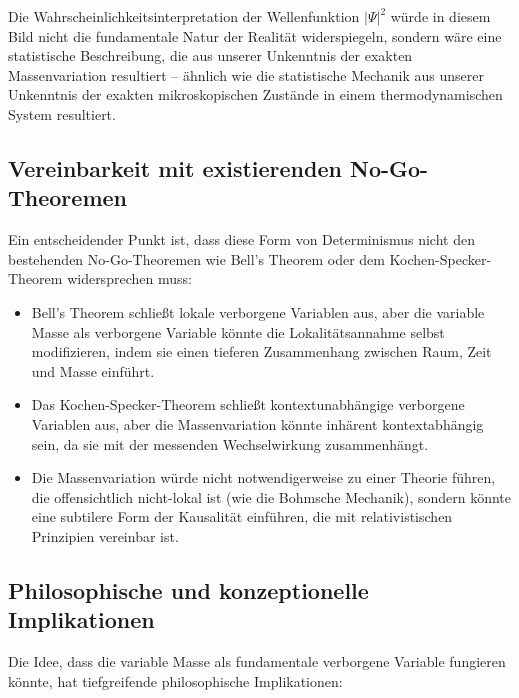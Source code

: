 \documentclass[12pt,a4paper]{article}  %
\begin{document}
	Die Wahrscheinlichkeitsinterpretation der Wellenfunktion $|\Psi|^2$ würde in diesem Bild nicht die fundamentale Natur der Realität widerspiegeln, sondern wäre eine statistische Beschreibung, die aus unserer Unkenntnis der exakten Massenvariation resultiert – ähnlich wie die statistische Mechanik aus unserer Unkenntnis der exakten mikroskopischen Zustände in einem thermodynamischen System resultiert.
	
	\subsection{Vereinbarkeit mit existierenden No-Go-Theoremen}
	
	Ein entscheidender Punkt ist, dass diese Form von Determinismus nicht den bestehenden No-Go-Theoremen wie Bell's Theorem oder dem Kochen-Specker-Theorem widersprechen muss:
	
	\begin{itemize}
		\item Bell's Theorem schließt lokale verborgene Variablen aus, aber die variable Masse als verborgene Variable könnte die Lokalitätsannahme selbst modifizieren, indem sie einen tieferen Zusammenhang zwischen Raum, Zeit und Masse einführt.
		
		\item Das Kochen-Specker-Theorem schließt kontextunabhängige verborgene Variablen aus, aber die Massenvariation könnte inhärent kontextabhängig sein, da sie mit der messenden Wechselwirkung zusammenhängt.
		
		\item Die Massenvariation würde nicht notwendigerweise zu einer Theorie führen, die offensichtlich nicht-lokal ist (wie die Bohmsche Mechanik), sondern könnte eine subtilere Form der Kausalität einführen, die mit relativistischen Prinzipien vereinbar ist.
	\end{itemize}
	
	\subsection{Philosophische und konzeptionelle Implikationen}
	
	Die Idee, dass die variable Masse als fundamentale verborgene Variable fungieren könnte, hat tiefgreifende philosophische Implikationen:
	
\end{document}
